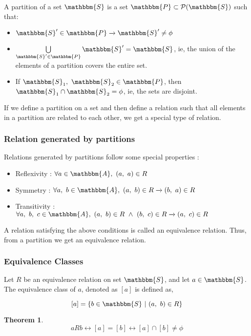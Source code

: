 \documentclass[14pt]{extarticle}
\newcommand{\impl}{\xrightarrow{}}
\newcommand{\ifff}{\longleftrightarrow}
\newcommand{\A}{\mathbbm{A}}
\newcommand{\Sset}{\mathbbm{S}}
\newcommand{\Pset}{\mathbbm{P}}
\newcommand{\powerset}{\mathcal{P}}
\newtheorem{theorem}{Theorem}
\begin{document}
A partition of a set $\Sset$ is a set $\Pset \subset \powerset{(\Sset)}$ such that:

\begin{itemize}
    \item $\Sset' \in \Pset \impl \Sset' \neq \phi$
    \item $\bigcup\limits_{\Sset' \in \Pset} \Sset' = \Sset$, ie, the union of the elements of a partition covers the entire set.
    \item If $\Sset_1, \ \Sset_2 \in \Pset$, then $\Sset_1 \cap \Sset_2 = \phi$, ie, the sets are disjoint.
\end{itemize}

If we define a partition on a set and then define a relation such that all elements in a partition are related to each other, we get a special type of relation.

\subsubsection{Relation generated by partitions}

Relations generated by partitions follow some special properties :

\begin{itemize}
    \item Reflexivity : $\forall a \in \A , \ (a, \ a) \in R$
    \item Symmetry : $\forall a, \ b \in \A, \ (a, \ b) \in R \impl (b, \ a) \in R $
    \item Transitivity : $\forall a, \ b, \ c \in \A, \ (a, \ b) \in R \ \land \ (b, \ c) \in R \impl (a, \ c) \in R$
\end{itemize}

A relation satisfying the above conditions is called an equivalence relation. Thus, from a partition we get an equivalence relation.

\subsubsection{Equivalence Classes}

Let $R$ be an equivalence relation on set $\Sset$, and let $a \in \Sset$. The equivalence class of $a$, denoted as $[a]$ is defined as,

\[
    [a] = \{b \in \Sset \ | \ (a, \ b) \in R\}
\]

\begin{theorem}
    \[
        aRb \ifff [a] = [b] \ifff [a] \cap [b] \neq \phi
    \]
\end{theorem}
\end{document}
